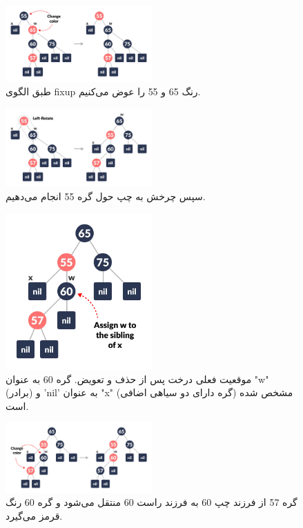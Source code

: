 \documentclass[a4paper,12pt]{article}
\begin{document}
	\begin{figure}[H]
		\centering
		\includegraphics[width=0.5\textwidth]{img/advancedDelFix/delete-5-red-black.png} %
		\caption{طبق الگوی fixup رنگ 65 و 55 را عوض می‌کنیم.}
	\end{figure}
	
	\begin{figure}[H]
		\centering
		\includegraphics[width=0.5\textwidth]{img/advancedDelFix/delete-6-red-black.png} %
		\caption{سپس چرخش به چپ حول گره 55 انجام می‌دهیم.}
	\end{figure}
	
	\begin{figure}[H]
		\centering
		\includegraphics[width=0.5\textwidth]{img/advancedDelFix/delete-7-red-black.png} %
		\caption{موقعیت فعلی درخت پس از حذف و تعویض. گره 60 به عنوان "w" (برادر) و 'nil' به عنوان "x" (گره دارای دو سیاهی اضافی) مشخص شده است.}
	\end{figure}
	
	\begin{figure}[H]
		\centering
		\includegraphics[width=0.5\textwidth]{img/advancedDelFix/delete-8-red-black.png} %
		\caption{گره 57 از فرزند چپ 60 به فرزند راست 60 منتقل می‌شود و گره 60 رنگ قرمز می‌گیرد.}
	\end{figure}
	
\end{document}
